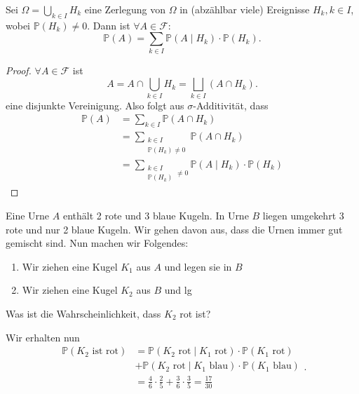 \begin{theorem}\label{thm:zerlegung-in-ereignisse-ergibt-aufaddieren-bedingter-wahrscheinlichkeiten}
    Sei $\Omega = \bigcup_{k\in I} H_k$ eine  Zerlegung von $\Omega$ in (abzählbar viele) Ereignisse $H_k, k\in I$, wobei $\mathbb{P}(H_k) \neq 0$. Dann ist $\forall A\in \mathcal{F}$:
    \[
        \mathbb{P}(A) = \sum_{k\in I} \mathbb{P}(A \mid H_k) \cdot \mathbb{P}(H_k)
    .\] 
\end{theorem}
\begin{proof}
    $\forall A\in \mathcal{F}$ ist
    \[
        A= A \cap  \bigcup_{k\in I} H_k = \bigsqcup_{k\in I} (A\cap H_k) 
    .\] 
    eine disjunkte Vereinigung. Also folgt aus $\sigma$-Additivität, dass
    \begin{equation*}
        \begin{split}
            \mathbb{P}(A) &= \sum_{k\in I} \mathbb{P}(A\cap H_k) \\
                          &= \sum_{\substack{ k\in I\\ \mathbb{P}(H_k)\neq 0}} \mathbb{P}(A\cap H_k) \\
                          &=\sum_{\substack{ k\in I \\ \mathbb{P}(H_k)}\neq 0} \mathbb{P}(A\mid H_k) \cdot  \mathbb{P}(H_k)
        \end{split}
    \end{equation*}
\end{proof}
\begin{example}
    Eine Urne $A$ enthält {\color{red} 2 rote} und {\color{blue} 3 blaue} Kugeln. In Urne  $B$ liegen umgekehrt {\color{red} 3 rote} und nur {\color{blue} 2 blaue} Kugeln. Wir gehen davon aus, dass die Urnen immer gut gemischt sind. Nun machen wir Folgendes:
    \begin{enumerate}[label=\protect\circled{\arabic*}]
        \item Wir ziehen eine Kugel $K_1$ aus $A$ und legen sie in  $B$
        \item Wir ziehen eine Kugel  $K_2$ aus $B$ und lg
    \end{enumerate}
    \begin{question}
    Was ist die Wahrscheinlichkeit, dass $K_2$ {\color{red} rot} ist?
    \end{question}
Wir erhalten nun
\[
    \begin{split}
        \mathbb{P}(K_2 \text{ ist rot}) &= \mathbb{P}(K_2 \text{ rot} \mid  K_1 \text{ rot})\cdot \mathbb{P}(K_1 \text{ rot}) \\
                                        &+\mathbb{P}(K_2 \text{ rot}\mid K_1 \text{ blau})\cdot \mathbb{P}(K_1 \text{ blau}) \\
    &= \frac{4}{6}\cdot \frac{2}{5} + \frac{3}{6}\cdot \frac{3}{5} = \frac{17}{30}
    \end{split}
.\] 
\end{example}
